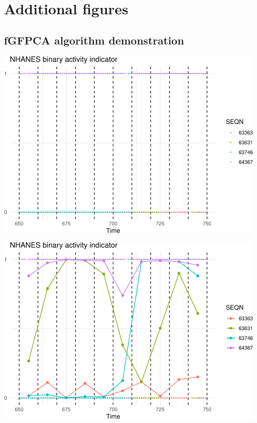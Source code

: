 \documentclass[
]{article}
\begin{document}
\hypertarget{additional-figures}{%
\section{Additional figures}\label{additional-figures}}

\hypertarget{fgfpca-algorithm-demonstration}{%
\subsection{fGFPCA algorithm
demonstration}\label{fgfpca-algorithm-demonstration}}

\includegraphics{manuscript_files/figure-latex/binning-1.pdf}

\includegraphics{manuscript_files/figure-latex/unnamed-chunk-11-1.pdf}
\end{document}
